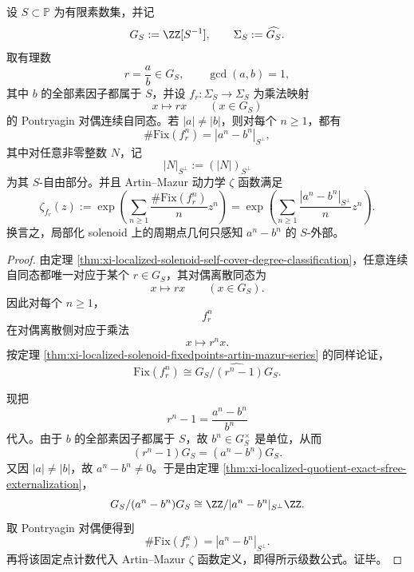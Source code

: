 \begin{theorem}\label{thm:xi-time-part69-localized-rational-endomorphism-fixedpoints-zeta}
设 \(S\subset\mathbb P\) 为有限素数集，并记
\[
G_S:=\ZZ[S^{-1}],
\qquad
\Sigma_S:=\widehat{G_S}.
\]
取有理数
\[
r=\frac{a}{b}\in G_S,
\qquad
\gcd(a,b)=1,
\]
其中 \(b\) 的全部素因子都属于 \(S\)，并设 \(f_r:\Sigma_S\to\Sigma_S\) 为乘法映射
\[
x\longmapsto rx\qquad (x\in G_S)
\]
的 Pontryagin 对偶连续自同态。若 \(|a|\neq |b|\)，则对每个 \(n\ge 1\)，都有
\[
\#\mathrm{Fix}(f_r^n)=|a^n-b^n|_{S^\perp},
\]
其中对任意非零整数 \(N\)，记
\[
|N|_{S^\perp}:=(|N|)_{S^\perp}
\]
为其 \(S\)-自由部分。并且 Artin--Mazur 动力学 \(\zeta\) 函数满足
\[
\zeta_{f_r}(z)
:=
\exp\!\left(
\sum_{n\ge 1}\frac{\#\mathrm{Fix}(f_r^n)}{n}z^n
\right)
=
\exp\!\left(
\sum_{n\ge 1}\frac{|a^n-b^n|_{S^\perp}}{n}z^n
\right).
\]
换言之，局部化 solenoid 上的周期点几何只感知 \(a^n-b^n\) 的 \(S\)-外部。
\end{theorem}
\begin{proof}
由定理 \ref{thm:xi-localized-solenoid-self-cover-degree-classification}，任意连续自同态都唯一对应于某个 \(r\in G_S\)，其对偶离散同态为
\[
x\longmapsto rx
\qquad (x\in G_S).
\]
因此对每个 \(n\ge 1\)，
\[
f_r^n
\]
在对偶离散侧对应于乘法
\[
x\longmapsto r^n x.
\]
按定理 \ref{thm:xi-localized-solenoid-fixedpoints-artin-mazur-series} 的同样论证，
\[
\mathrm{Fix}(f_r^n)\cong \widehat{G_S/(r^n-1)G_S}.
\]

现把
\[
r^n-1=\frac{a^n-b^n}{b^n}
\]
代入。由于 \(b\) 的全部素因子都属于 \(S\)，故 \(b^n\in G_S^\times\) 是单位，从而
\[
(r^n-1)G_S=(a^n-b^n)G_S.
\]
又因 \(|a|\neq |b|\)，故 \(a^n-b^n\neq 0\)。于是由定理 \ref{thm:xi-localized-quotient-exact-sfree-externalization}，
\[
G_S/(a^n-b^n)G_S
\cong
\ZZ/|a^n-b^n|_{S^\perp}\ZZ.
\]
取 Pontryagin 对偶便得到
\[
\#\mathrm{Fix}(f_r^n)=|a^n-b^n|_{S^\perp}.
\]
再将该固定点计数代入 Artin--Mazur \(\zeta\) 函数定义，即得所示级数公式。证毕。
\end{proof}

